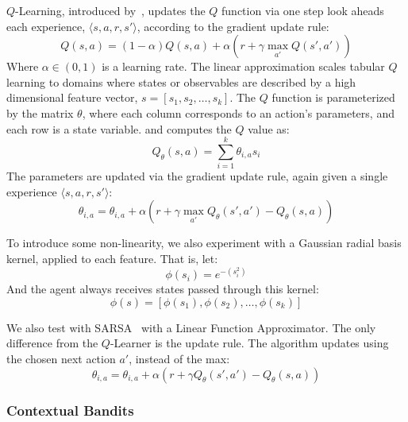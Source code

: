 \documentclass{article}
\begin{document}
$Q$-Learning, introduced by~\citet{watkins1992q}, updates the $Q$ function via one step look aheads each experience, $\langle s, a, r, s' \rangle$, according to the gradient update rule:
\begin{equation}
Q(s,a) = (1-\alpha) Q(s,a) + \alpha(r + \gamma \max_{a'} Q(s', a'))
\end{equation}
Where $\alpha \in (0,1)$ is a learning rate. The linear approximation scales tabular $Q$ learning to domains where states or observables are described by a high dimensional feature vector, $s = [s_1, s_2, \ldots, s_k]$. The $Q$ function is parameterized by the matrix $\theta$, where each column corresponds to an action's parameters, and each row is a state variable. and computes the $Q$ value as:
\begin{equation}
Q_\theta(s,a) = \sum_{i=1}^k \theta_{i,a} s_i
\end{equation}
The parameters are updated via the gradient update rule, again given a single experience $\langle s, a, r, s' \rangle$:
\begin{equation}
\theta_{i,a} = \theta_{i,a} + \alpha \left( r + \gamma \max_{a'} Q_\theta(s',a') - Q_\theta(s,a)\right)
\end{equation}

To introduce some non-linearity, we also experiment with a Gaussian radial basis kernel, applied to each feature. That is, let:
\begin{equation}
\phi(s_i) = e^{-(s_i^2)}
\end{equation}
And the agent always receives states passed through this kernel:
\begin{equation}
\phi(s) = [\phi(s_1), \phi(s_2), \ldots, \phi(s_k)]
\end{equation}

We also test with SARSA~\cite{rummery1994line} with a Linear Function Approximator. The only difference from the $Q$-Learner is the update rule. The algorithm updates using the chosen next action $a'$, instead of the max:
\begin{equation}
\theta_{i,a} = \theta_{i,a} + \alpha \left( r + \gamma Q_\theta(s',a') - Q_\theta(s,a)\right)
\end{equation}

\subsubsection{Contextual Bandits}
\end{document}

